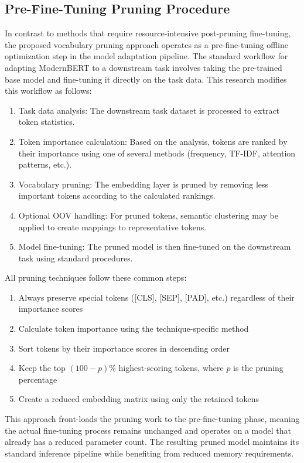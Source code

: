 \documentclass[twocolumn]{article}
\begin{document}
\subsection{Pre-Fine-Tuning Pruning Procedure}
In contrast to methods that require resource-intensive post-pruning fine-tuning, the proposed vocabulary pruning approach operates as a pre-fine-tuning offline optimization step in the model adaptation pipeline. The standard workflow for adapting ModernBERT to a downstream task involves taking the pre-trained base model and fine-tuning it directly on the task data. This research modifies this workflow as follows:

\begin{enumerate}
    \item Task data analysis: The downstream task dataset is processed to extract token statistics.
    \item Token importance calculation: Based on the analysis, tokens are ranked by their importance using one of several methods (frequency, TF-IDF, attention patterns, etc.).
    \item Vocabulary pruning: The embedding layer is pruned by removing less important tokens according to the calculated rankings.
    \item Optional OOV handling: For pruned tokens, semantic clustering may be applied to create mappings to representative tokens.
    \item Model fine-tuning: The pruned model is then fine-tuned on the downstream task using standard procedures.
\end{enumerate}
All pruning techniques follow these common steps:
\begin{enumerate}
    \item Always preserve special tokens ([CLS], [SEP], [PAD], etc.) regardless of their importance scores
    \item Calculate token importance using the technique-specific method
    \item Sort tokens by their importance scores in descending order
    \item Keep the top $(100-p)\%$ highest-scoring tokens, where $p$ is the pruning percentage
    \item Create a reduced embedding matrix using only the retained tokens
\end{enumerate}
This approach front-loads the pruning work to the pre-fine-tuning phase, meaning the actual fine-tuning process remains unchanged and operates on a model that already has a reduced parameter count. The resulting pruned model maintains its standard inference pipeline while benefiting from reduced memory requirements.
\end{document}

